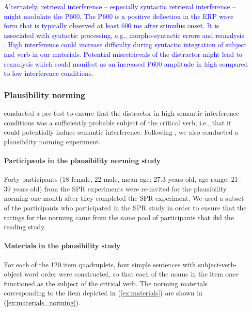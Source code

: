 \documentclass[a4paper, man, floatsintext]{apa7}
\begin{document}
{\textcolor{blue}{Alternately, retrieval interference -- especially syntactic retrieval interference -- might modulate the P600. The P600 is a positive deflection in the ERP wave form that is typically observed at least 600 ms after stimulus onset. It is associated with syntactic processing, e.g., morpho-syntactic errors and reanalysis \citep[see, e.g.,][]{osterhout&holcomb_1992, kaan_etal_2000_P600}. High interference could increase difficulty during syntactic integration of subject and verb in our materials. Potential misretrievals of the distractor might lead to reanalysis which could manifest as an increased P600 amplitude in high compared to low interference conditions.}} \label{why_n400}




\subsubsection{Plausibility norming} \label{plausib_normin_orig}
\citeauthor{vandyke07} conducted a pre-test to ensure that the distractor in high semantic interference conditions was a sufficiently probable subject of the critical verb, i.e., that it could potentially induce semantic interference. Following \citeauthor{vandyke07}, we also conducted a plausibility norming experiment.

\paragraph{Participants in the plausibility norming study}
Forty participants (18 female, 22 male, mean age: 27.3 years old, age range: 21 - 39 years old) from the SPR experiments were re-invited for the plausibility norming one month after they completed the SPR experiment. We used a subset of the participants who participated in the SPR study in order to ensure that the ratings for the norming came from the same pool of participants that did the reading study.

\paragraph{Materials in the plausibility study}
For each of the 120 item quadruplets, four simple sentences with subject-verb-object word order were constructed, so that each of the nouns in the item once functioned as the subject of the critical verb. The norming materials corresponding to the item depicted in (\ref{ex:materials}) are shown in (\ref{ex:materials_norming}).
\end{document}
